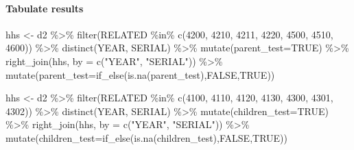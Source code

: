 \documentclass[
]{book}
\newenvironment{Shaded}{\begin{snugshade}}{\end{snugshade}}
\newcommand{\AttributeTok}[1]{\textcolor[rgb]{0.77,0.63,0.00}{#1}}
\newcommand{\ConstantTok}[1]{\textcolor[rgb]{0.00,0.00,0.00}{#1}}
\newcommand{\DecValTok}[1]{\textcolor[rgb]{0.00,0.00,0.81}{#1}}
\newcommand{\FunctionTok}[1]{\textcolor[rgb]{0.00,0.00,0.00}{#1}}
\newcommand{\NormalTok}[1]{#1}
\newcommand{\OtherTok}[1]{\textcolor[rgb]{0.56,0.35,0.01}{#1}}
\newcommand{\SpecialCharTok}[1]{\textcolor[rgb]{0.00,0.00,0.00}{#1}}
\newcommand{\StringTok}[1]{\textcolor[rgb]{0.31,0.60,0.02}{#1}}
\begin{document}
\hypertarget{tabulate-results}{%
\paragraph*{Tabulate results}\label{tabulate-results}}

\begin{Shaded}
\begin{Highlighting}[]
\NormalTok{  hhs }\OtherTok{\textless{}{-}}\NormalTok{ d2 }\SpecialCharTok{\%\textgreater{}\%} \FunctionTok{filter}\NormalTok{(RELATED }\SpecialCharTok{\%in\%} \FunctionTok{c}\NormalTok{(}\DecValTok{4200}\NormalTok{, }\DecValTok{4210}\NormalTok{, }\DecValTok{4211}\NormalTok{, }\DecValTok{4220}\NormalTok{, }\DecValTok{4500}\NormalTok{, }\DecValTok{4510}\NormalTok{, }\DecValTok{4600}\NormalTok{)) }\SpecialCharTok{\%\textgreater{}\%} \FunctionTok{distinct}\NormalTok{(YEAR, SERIAL) }\SpecialCharTok{\%\textgreater{}\%} \FunctionTok{mutate}\NormalTok{(}\AttributeTok{parent\_test=}\ConstantTok{TRUE}\NormalTok{) }\SpecialCharTok{\%\textgreater{}\%} \FunctionTok{right\_join}\NormalTok{(hhs, }\AttributeTok{by =} \FunctionTok{c}\NormalTok{(}\StringTok{"YEAR"}\NormalTok{, }\StringTok{"SERIAL"}\NormalTok{)) }\SpecialCharTok{\%\textgreater{}\%} \FunctionTok{mutate}\NormalTok{(}\AttributeTok{parent\_test=}\FunctionTok{if\_else}\NormalTok{(}\FunctionTok{is.na}\NormalTok{(parent\_test),}\ConstantTok{FALSE}\NormalTok{,}\ConstantTok{TRUE}\NormalTok{))}


\NormalTok{  hhs }\OtherTok{\textless{}{-}}\NormalTok{ d2 }\SpecialCharTok{\%\textgreater{}\%} \FunctionTok{filter}\NormalTok{(RELATED }\SpecialCharTok{\%in\%} \FunctionTok{c}\NormalTok{(}\DecValTok{4100}\NormalTok{, }\DecValTok{4110}\NormalTok{, }\DecValTok{4120}\NormalTok{, }\DecValTok{4130}\NormalTok{, }\DecValTok{4300}\NormalTok{, }\DecValTok{4301}\NormalTok{, }\DecValTok{4302}\NormalTok{)) }\SpecialCharTok{\%\textgreater{}\%} \FunctionTok{distinct}\NormalTok{(YEAR, SERIAL) }\SpecialCharTok{\%\textgreater{}\%} \FunctionTok{mutate}\NormalTok{(}\AttributeTok{children\_test=}\ConstantTok{TRUE}\NormalTok{) }\SpecialCharTok{\%\textgreater{}\%} \FunctionTok{right\_join}\NormalTok{(hhs, }\AttributeTok{by =} \FunctionTok{c}\NormalTok{(}\StringTok{"YEAR"}\NormalTok{, }\StringTok{"SERIAL"}\NormalTok{)) }\SpecialCharTok{\%\textgreater{}\%} \FunctionTok{mutate}\NormalTok{(}\AttributeTok{children\_test=}\FunctionTok{if\_else}\NormalTok{(}\FunctionTok{is.na}\NormalTok{(children\_test),}\ConstantTok{FALSE}\NormalTok{,}\ConstantTok{TRUE}\NormalTok{))}
  

\end{Highlighting}
\end{Shaded}
\end{document}
